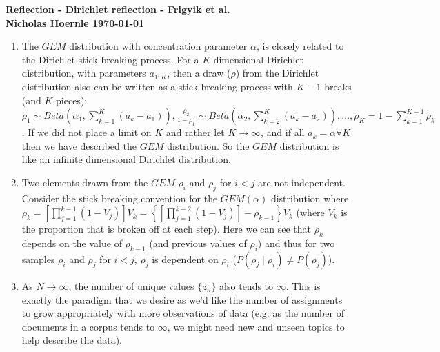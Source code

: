 \documentclass[twoside]{article}
\begin{document}
\textbf{Reflection - Dirichlet reflection - Frigyik et al.}\\
\textbf{Nicholas Hoernle \hfill \today}

\begin{enumerate}
  \item The $GEM$ distribution with concentration parameter $\alpha$, is closely related to the Dirichlet stick-breaking process. For a $K$ dimensional Dirichlet distribution, with parameters $a_{1:K}$, then a draw ($\rho$) from the Dirichlet distribution also can be written as a stick breaking process with $K-1$ breaks (and $K$ pieces):\\ $\rho_1 \sim Beta(\alpha_1, \sum\limits_{k=1}^K(a_k-a_1)), \frac{\rho_2}{1-\rho_1} \sim Beta(\alpha_2, \sum\limits_{k=2}^K(a_k-a_2)), \hdots, \rho_K = 1-\sum\limits_{k=1}^{K-1}\rho_k$. If we did not place a limit on $K$ and rather let $K \rightarrow \infty$, and if all $a_k = \alpha \forall K$ then we have described the $GEM$ distribution. So the $GEM$ distribution is like an infinite dimensional Dirichlet distribution.
  \item Two elements drawn from the $GEM$ $\rho_i$ and $\rho_j$ for $i < j$ are not independent. Consider the stick breaking convention for the $GEM(\alpha)$ distribution where $\rho_k = \left[ \prod\limits_{j=1}^{k-1}(1-V_j) \right] V_k = \left\{ \left[ \prod\limits_{j=1}^{k-2}(1-V_j) \right] - \rho_{k-1} \right\} V_k$ (where $V_k$ is the proportion that is broken off at each step). Here we can see that $\rho_k$ depends on the value of $\rho_{k-1}$ (and previous values of $\rho_i$) and thus for two samples $\rho_i$ and $\rho_j$ for $i < j$, $\rho_j$ is dependent on $\rho_i$ ($P(\rho_{j} \mid \rho_{i}) \neq P(\rho_{j})$).
  \item As $N \rightarrow \infty$, the number of unique values $\{ z_n \}$ also tends to $\infty$. This is exactly the paradigm that we desire as we'd like the number of assignments to grow appropriately with more observations of data (e.g. as the number of documents in a corpus tends to $\infty$, we might need new and unseen topics to help describe the data).
\end{enumerate}
\end{document}

